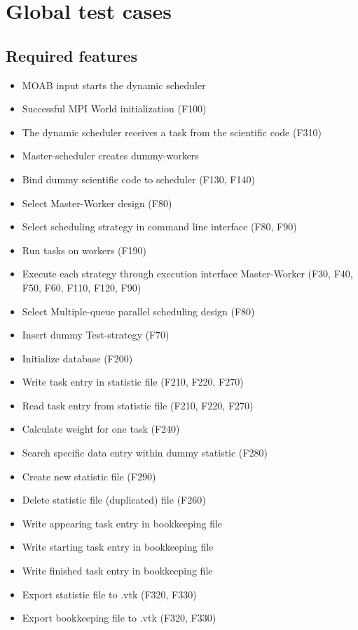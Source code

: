 {
\setcounter{funcGTC}{10}
\renewcommand{\labelitemi}{
	\ifnum \value{funcGTC}<10$/T 0\arabic{funcNFR} /$\addtocounter{funcGTC}{10}
	\else $/T \arabic{funcNFR} /$\addtocounter{funcGTC}{10}\fi
}

\section{Global test cases}
	\subsection{Required features}		
		\begin{itemize}
			\item MOAB input starts the dynamic scheduler
			\item Successful MPI World initialization (F100)
			
			\item The dynamic scheduler receives a task from the scientific code (F310)
			\item Master-scheduler creates dummy-workers
			\item Bind dummy scientific code to scheduler (F130, F140)
			
			\item Select Master-Worker design (F80)
			\item Select scheduling strategy in command line interface (F80, F90)
			\item Run tasks on workers (F190)
			\item Execute each strategy through execution interface Master-Worker (F30, F40, F50, F60, 							F110, F120, F90)	
			\item Select Multiple-queue parallel scheduling design (F80)
			\item Insert dummy Test-strategy (F70)
			
			\item Initialize database (F200)
			\item Write task entry in statistic file (F210, F220, F270)
			\item Read task entry from statistic file (F210, F220, F270)
			\item Calculate weight for one task (F240)
			\item Search specific data entry within dummy statistic (F280)
			\item Create new statistic file (F290)
			\item Delete statistic file (duplicated) file (F260)
			\item Write appearing task entry in bookkeeping file
			\item Write starting task entry in bookkeeping file
			\item Write finished task entry in bookkeeping file
			\item Export statistic file to .vtk (F320, F330)
			\item Export bookkeeping file to .vtk (F320, F330)
		\end{itemize}
		
}
